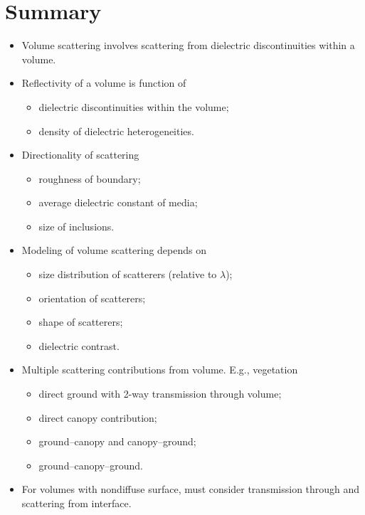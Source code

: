 \documentclass[11pt, oneside]{article}
\begin{document}
\section{Summary}
\label{s:summary}

\begin{itemize}
	\item Volume scattering involves scattering from dielectric discontinuities within a volume.
	\item Reflectivity of a volume is function of
	\begin{itemize}
		\item dielectric discontinuities within the volume;
		\item density of dielectric heterogeneities.
	\end{itemize}
	\item Directionality of scattering
	\begin{itemize}
		\item roughness of boundary;
		\item average dielectric constant of media;
		\item size of inclusions.
	\end{itemize}
	\item Modeling of volume scattering depends on
	\begin{itemize}
		\item size distribution of scatterers (relative to $\lambda$);
		\item orientation of scatterers;
		\item shape of scatterers;
		\item dielectric contrast.
	\end{itemize}
	\item Multiple scattering contributions from volume. E.g., vegetation
	\begin{itemize}
		\item direct ground with 2-way transmission through volume;
		\item direct canopy contribution;
		\item ground--canopy and canopy--ground;
		\item ground--canopy--ground.
	\end{itemize}
	\item For volumes with nondiffuse surface, must consider transmission through and scattering from interface.
\end{itemize}

\clearpage
\end{document}
